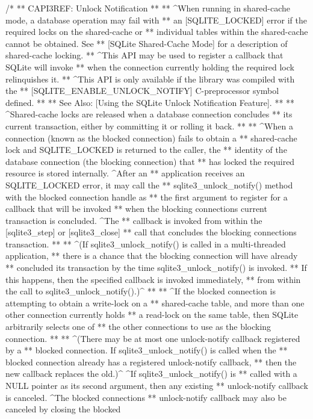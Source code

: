 \begin{Codex}[label=sqlite3.h,numbers=left]
{/*
** CAPI3REF: Unlock Notification
**
** ^When running in shared-cache mode, a database operation may fail with
** an [SQLITE_LOCKED] error if the required locks on the shared-cache or
** individual tables within the shared-cache cannot be obtained. See
** [SQLite Shared-Cache Mode] for a description of shared-cache locking. 
** ^This API may be used to register a callback that SQLite will invoke 
** when the connection currently holding the required lock relinquishes it.
** ^This API is only available if the library was compiled with the
** [SQLITE_ENABLE_UNLOCK_NOTIFY] C-preprocessor symbol defined.
**
** See Also: [Using the SQLite Unlock Notification Feature].
**
** ^Shared-cache locks are released when a database connection concludes
** its current transaction, either by committing it or rolling it back. 
**
** ^When a connection (known as the blocked connection) fails to obtain a
** shared-cache lock and SQLITE_LOCKED is returned to the caller, the
** identity of the database connection (the blocking connection) that
** has locked the required resource is stored internally. ^After an 
** application receives an SQLITE_LOCKED error, it may call the
** sqlite3_unlock_notify() method with the blocked connection handle as 
** the first argument to register for a callback that will be invoked
** when the blocking connections current transaction is concluded. ^The
** callback is invoked from within the [sqlite3_step] or [sqlite3_close]
** call that concludes the blocking connections transaction.
**
** ^(If sqlite3_unlock_notify() is called in a multi-threaded application,
** there is a chance that the blocking connection will have already
** concluded its transaction by the time sqlite3_unlock_notify() is invoked.
** If this happens, then the specified callback is invoked immediately,
** from within the call to sqlite3_unlock_notify().)^
**
** ^If the blocked connection is attempting to obtain a write-lock on a
** shared-cache table, and more than one other connection currently holds
** a read-lock on the same table, then SQLite arbitrarily selects one of 
** the other connections to use as the blocking connection.
**
** ^(There may be at most one unlock-notify callback registered by a 
** blocked connection. If sqlite3_unlock_notify() is called when the
** blocked connection already has a registered unlock-notify callback,
** then the new callback replaces the old.)^ ^If sqlite3_unlock_notify() is
** called with a NULL pointer as its second argument, then any existing
** unlock-notify callback is canceled. ^The blocked connections 
** unlock-notify callback may also be canceled by closing the blocked
}
\end{Codex}
